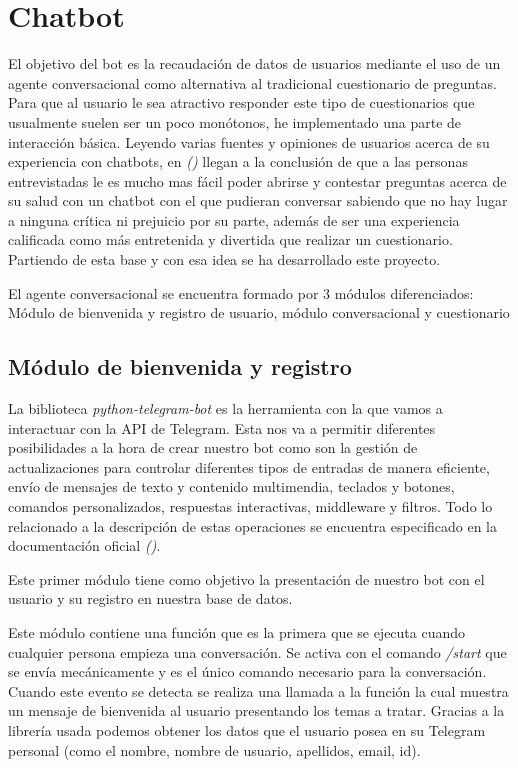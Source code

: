\chapter{Chatbot}

El objetivo del bot es la recaudación de datos de usuarios mediante el uso de un agente conversacional como alternativa al tradicional cuestionario de preguntas. Para que al usuario le sea atractivo responder este tipo de cuestionarios que usualmente suelen ser un poco monótonos, he implementado una parte de interacción básica. Leyendo varias fuentes y opiniones de usuarios acerca de su experiencia con chatbots, 
 en \textit{(\cite{wellbeingchabot})} llegan a la conclusión de que a las personas entrevistadas le es mucho mas fácil poder abrirse y contestar preguntas acerca de su salud con un chatbot con el que pudieran conversar sabiendo que no hay lugar a ninguna crítica ni prejuicio por su parte, además de ser una experiencia calificada como más entretenida y divertida que realizar un cuestionario. Partiendo de esta base y con esa idea se ha desarrollado este proyecto. 

El agente conversacional se encuentra formado por 3 módulos diferenciados: Módulo de bienvenida y registro de usuario, módulo conversacional y cuestionario

\section{Módulo de bienvenida y registro}

La biblioteca \textit{python-telegram-bot} es la herramienta con la que vamos a interactuar con la API de Telegram. Esta nos va a permitir diferentes posibilidades a la hora de crear nuestro bot como son la gestión de actualizaciones para controlar diferentes tipos de entradas de manera eficiente, envío de mensajes de texto y contenido multimendia, teclados y botones, comandos personalizados, respuestas interactivas, middleware y filtros. Todo lo relacionado a la descripción de estas operaciones se encuentra especificado en la documentación oficial \textit{(\cite{pythontelegrambot})}.

Este primer módulo tiene como objetivo la presentación de nuestro bot con el usuario y su registro en nuestra base de datos. \vspace{1cm}


Este módulo contiene una función que es la primera que se ejecuta cuando cualquier persona empieza una conversación. Se activa con el comando \textit{/start} que se envía mecánicamente y es el único comando necesario para la conversación. Cuando este evento se detecta se realiza una llamada a la función la cual muestra un mensaje de bienvenida al usuario presentando los temas a tratar. Gracias a la librería usada podemos obtener los datos que el usuario posea en su Telegram personal (como el nombre, nombre de usuario, apellidos, email, id).\vspace{0.3cm}

